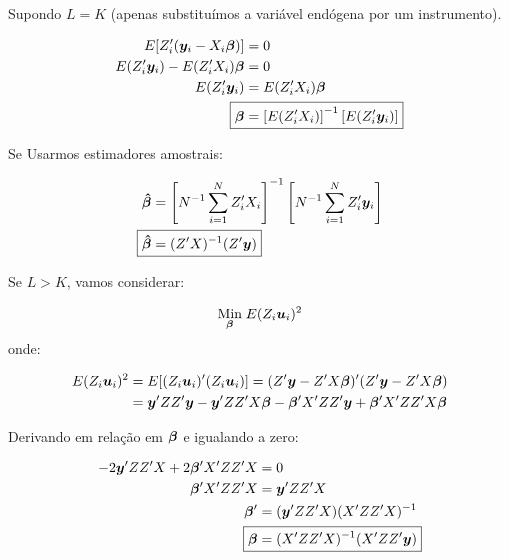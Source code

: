 \documentclass[11pt,oneside,a4paper]{article}
\numberwithin{equation}{section}
\begin{document}
Supondo $L = K$ (apenas substituímos a variável endógena por um instrumento).

\vspace{-1 em}
\begin{align*}
E[ Z_{i}^{\prime} ( \mbs{y}_{i} - X_{i} \mbs{\beta} ) ] &= 0
\\
E( Z_{i}^{\prime} \mbs{y}_{i} ) - E( Z_{i}^{\prime} X_{i} ) \mbs{\beta} &= 0
\\
E( Z_{i}^{\prime} \mbs{y}_{i} ) &= E( Z_{i}^{\prime} X_{i} ) \mbs{\beta}
\\
\Aboxed{
\mbs{\beta} &=
\left[ E( Z_{i}^{\prime} X_{i} ) \right]^{-1}
\left[ E( Z_{i}^{\prime} \mbs{y}_{i} ) \right]
}
\end{align*}

Se Usarmos estimadores amostrais:

\vspace{-1 em}
\begin{align*}
\mbs{\hat{\beta}} &=
\left[ N^{-1} \sum_{i=1}^{N} Z_{i}^{\prime} X_{i} \right]^{-1}
\left[ N^{-1} \sum_{i=1}^{N} Z_{i}^{\prime} \mbs{y}_{i} \right]
\\
\Aboxed{
\mbs{\hat{\beta}} &=
( Z^{\prime} X )^{-1} ( Z^{\prime} \mbs{y} ) }
\end{align*}

\vspace{1 em}
Se $L > K$, vamos considerar:

\vspace{-1 em}
\begin{align*}
\underset{\boldsymbol{\beta}}{\text{Min}} \;
E( Z_{i}\boldsymbol{u}_{i} )^2
\end{align*}
\noindent onde:

\vspace{-1 em}
\begin{align*}
E( Z_{i}\boldsymbol{u}_{i} )^2 
&=
E[ ( Z_{i}\boldsymbol{u}_{i} )' ( Z_{i}\boldsymbol{u}_{i} ) ]
=
( Z' \boldsymbol{y} - Z' X \boldsymbol{\beta} )' ( Z' \boldsymbol{y} - Z' X \boldsymbol{\beta} )
\\
&=
\boldsymbol{y}' ZZ' \boldsymbol{y}
-
\boldsymbol{y}' ZZ' X \boldsymbol{\beta}
-
\boldsymbol{\beta}' X' ZZ' \boldsymbol{y}
+
\boldsymbol{\beta}' X' ZZ' X \boldsymbol{\beta}
\end{align*}

Derivando em relação em $\boldsymbol{\beta}$ e igualando a zero:

\vspace{-1 em}
\begin{align*}
-2 \mbs{y}' ZZ' X + 2 \mbs{\beta}'X' ZZ' X &= 0
\\
\mbs{\beta}'X' ZZ' X &= \mbs{y}' ZZ' X 
\\
\mbs{\beta}' &= ( \mbs{y}' ZZ' X ) ( X' ZZ' X )^{-1}
\\
\Aboxed{
\mbs{\beta} &= ( X' ZZ' X )^{-1} ( X' ZZ' \mbs{y} ) }
\end{align*}
\end{document}
